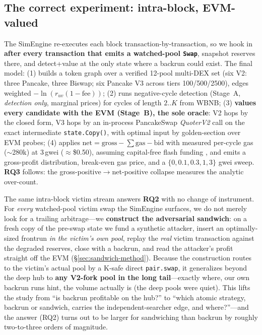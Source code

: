 \documentclass[11pt]{article}
\newcommand{\code}[1]{\texttt{#1}}
\begin{document}
\subsection{The correct experiment: intra-block, EVM-valued}
The SimEngine re-executes each block transaction-by-transaction, so we hook in
\textbf{after every transaction that emits a watched-pool \code{Swap}}, snapshot
reserves there, and detect+value at the only state where a backrun could exist. The
final model: (1) builds a token graph over a verified 12-pool multi-DEX set (six V2:
three Pancake, three Biswap; six Pancake V3 across tiers 100/500/2500), edges
weighted $-\ln(r_{uv}(1-\text{fee}))$; (2) runs negative-cycle detection (Stage~A,
\emph{detection only}, marginal prices) for cycles of length $2..K$ from WBNB; (3)
\textbf{values every candidate with the EVM (Stage~B), the sole oracle}: V2 hops by
the closed form, V3 hops by an in-process PancakeSwap \emph{QuoterV2} call on the
exact intermediate \code{state.Copy()}, with optimal input by golden-section over
EVM probes; (4) applies $\text{net} = \text{gross} - \sum\text{gas} - \text{bid}$
with measured per-cycle gas ($\sim$280k) at 3\,gwei ($\approx$\$0.50), assuming
capital-free flash funding \cite{qin2021flashloans}, and emits a gross-profit
distribution, break-even gas price, and a $\{0,0.1,0.3,1,3\}$ gwei sweep.
\textbf{RQ3} follows: the gross-positive$\to$net-positive collapse measures the
analytic over-count.

The same intra-block victim stream answers \textbf{RQ2} with no change of
instrument. For \emph{every} watched-pool victim swap the SimEngine surfaces, we do
not merely look for a trailing arbitrage---we \textbf{construct the adversarial
sandwich}: on a fresh copy of the pre-swap state we fund a synthetic attacker,
insert an optimally-sized frontrun \emph{in the victim's own pool}, replay the
\emph{real} victim transaction against the degraded reserves, close with a backrun,
and read the attacker's profit straight off the EVM (\S\ref{sec:sandwich-method}).
Because the construction routes to the victim's actual pool by a K-safe direct
\code{pair.swap}, it generalizes beyond the deep hub to \textbf{any V2-fork pool in
the long tail}---exactly where, our own backrun runs hint, the volume actually is
(the deep pools were quiet). This lifts the study from ``is backrun profitable on
the hub?'' to ``which atomic strategy, backrun or sandwich, carries the
independent-searcher edge, and where?''---and the answer (RQ2) turns out to be larger
for sandwiching than backrun by roughly two-to-three orders of magnitude.
\end{document}
